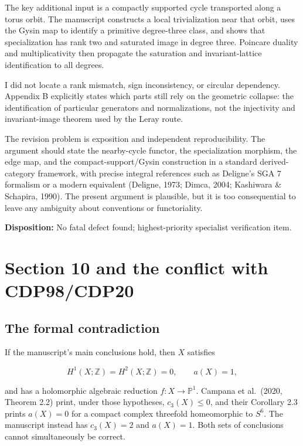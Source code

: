 \documentclass[
  10pt,
  letterpaper,
]{article}
\newcommand{\Z}{\mathbb Z}
\newcommand{\Pone}{\mathbb P^1}
\begin{document}
The key additional input is a compactly supported cycle transported
along a torus orbit. The manuscript constructs a local trivialization
near that orbit, uses the Gysin map to identify a primitive degree-three
class, and shows that specialization has rank two and saturated image in
degree three. Poincare duality and multiplicativity then propagate the
saturation and invariant-lattice identification to all degrees.

I did not locate a rank mismatch, sign inconsistency, or circular
dependency. Appendix B explicitly states which parts still rely on the
geometric collapse: the identification of particular generators and
normalizations, not the injectivity and invariant-image theorem used by
the Leray route.

The revision problem is exposition and independent reproducibility. The
argument should state the nearby-cycle functor, the specialization
morphism, the edge map, and the compact-support/Gysin construction in a
standard derived-category framework, with precise integral references
such as Deligne's SGA 7 formalism or a modern equivalent (Deligne, 1973;
Dimca, 2004; Kashiwara \& Schapira, 1990). The present argument is
plausible, but it is too consequential to leave any ambiguity about
conventions or functoriality.

\textbf{Disposition:} No fatal defect found; highest-priority specialist
verification item.

\section{Section 10 and the conflict with
CDP98/CDP20}\label{section-10-and-the-conflict-with-cdp98cdp20}

\subsection{The formal contradiction}\label{the-formal-contradiction}

If the manuscript's main conclusions hold, then \(X\) satisfies

\[
H^1(X;\Z)=H^2(X;\Z)=0,
\qquad a(X)=1,
\]

and has a holomorphic algebraic reduction \(f:X\to\Pone\). Campana et
al.~(2020, Theorem 2.2) print, under those hypotheses, \(c_3(X)\le0\),
and their Corollary 2.3 prints \(a(X)=0\) for a compact complex
threefold homeomorphic to \(S^6\). The manuscript instead has
\(c_3(X)=2\) and \(a(X)=1\). Both sets of conclusions cannot
simultaneously be correct.
\end{document}
